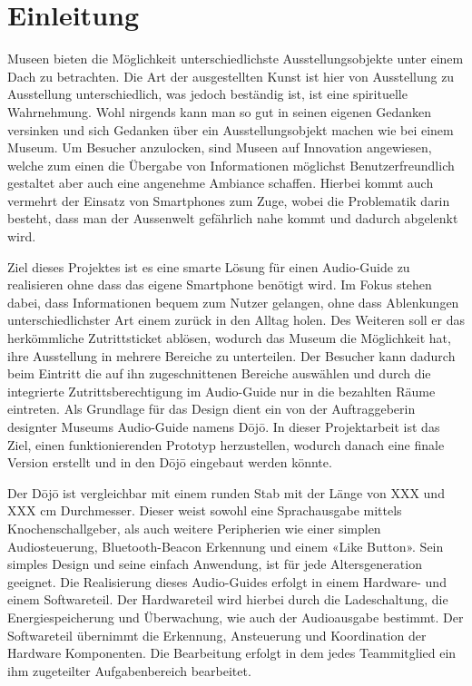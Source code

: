 \section{Einleitung}\label{sec:einleitung}
Museen bieten die Möglichkeit unterschiedlichste Ausstellungsobjekte unter einem Dach zu betrachten. Die Art der ausgestellten Kunst ist hier von Ausstellung zu Ausstellung unterschiedlich, was jedoch beständig ist, ist eine spirituelle Wahrnehmung. Wohl nirgends kann man so gut in seinen eigenen Gedanken versinken und sich Gedanken über ein Ausstellungsobjekt machen wie bei einem Museum. Um Besucher anzulocken, sind Museen auf Innovation angewiesen, welche zum einen die Übergabe von Informationen möglichst Benutzerfreundlich gestaltet aber auch eine angenehme Ambiance schaffen. Hierbei kommt auch vermehrt der Einsatz von Smartphones zum Zuge, wobei die Problematik darin besteht, dass man der Aussenwelt gefährlich nahe kommt und dadurch abgelenkt wird.

Ziel dieses Projektes ist es eine smarte Lösung für einen Audio-Guide zu realisieren ohne dass das eigene Smartphone benötigt wird. Im Fokus stehen dabei, dass Informationen bequem zum Nutzer gelangen, ohne dass Ablenkungen unterschiedlichster Art einem zurück in den Alltag holen. Des Weiteren soll er das herkömmliche Zutrittsticket ablösen, wodurch das Museum die Möglichkeit hat, ihre Ausstellung in mehrere Bereiche zu unterteilen. Der Besucher kann dadurch beim Eintritt die auf ihn zugeschnittenen Bereiche auswählen und durch die integrierte Zutrittsberechtigung im Audio-Guide nur in die bezahlten Räume eintreten. Als Grundlage für das Design dient ein von der Auftraggeberin designter Museums Audio-Guide namens Dōjō. In dieser Projektarbeit ist das Ziel, einen funktionierenden Prototyp herzustellen, wodurch danach eine finale Version erstellt und in den Dōjō eingebaut werden könnte.

Der Dōjō ist vergleichbar mit einem runden Stab mit der Länge von XXX und XXX cm Durchmesser. Dieser weist sowohl eine Sprachausgabe mittels Knochenschallgeber, als auch weitere Peripherien wie einer simplen Audiosteuerung, Bluetooth-Beacon Erkennung und einem «Like Button». Sein simples Design und seine einfach Anwendung, ist für jede Altersgeneration geeignet. Die Realisierung dieses Audio-Guides erfolgt in einem Hardware- und einem Softwareteil. Der Hardwareteil wird hierbei durch die Ladeschaltung, die Energiespeicherung und Überwachung, wie auch der Audioausgabe bestimmt. Der Softwareteil übernimmt die Erkennung, Ansteuerung und Koordination der Hardware Komponenten. Die Bearbeitung erfolgt in dem jedes Teammitglied ein ihm zugeteilter Aufgabenbereich bearbeitet.

